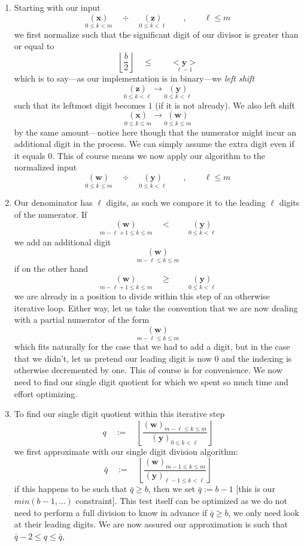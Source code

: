 \documentclass[twoside]{article}
\renewcommand{\leq}{\ensuremath{\quad\le\qquad}}
\renewcommand{\geq}{\ensuremath{\quad\ge\qquad}}
\newcommand{\bunderseq}[2][u]{\ensuremath{\underset{#2}{<\!\!\bm{#1}\!\!>}}}
\newcommand{\bradix}[2][u]{\ensuremath{\underset{#2}{(\bm{#1})}}}
\newcommand{\numer}[3][w]{\ensuremath{(\bm{#1})_{#2\le k\le #3}}}
\newcommand{\denom}[3][y]{\ensuremath{(\bm{#1})_{#2\le k <  #3}}}
\begin{document}
\begin{enumerate}
\item Starting with our input
$$ \bradix[x]{0\le k < m}\quad\div\quad\bradix[z]{0\le k < \ell}\qquad,\qquad \ell\le m $$
we first normalize such that the significant digit of our divisor is greater than or equal to
$$ \left\lfloor\frac{b}{2}\right\rfloor\leq\bunderseq[y]{\ell-1} $$
which is to say---as our implementation is in binary---we \emph{left shift}
$$ \bradix[z]{0\le k < \ell}\to\bradix[y]{0\le k < \ell} $$
such that its leftmost digit becomes $ 1 $ (if it is not already). We also left shift
$$ \bradix[x]{0\le k\le m}\to\bradix[w]{0\le k\le m} $$
by the same amount---notice here though that the numerator might incur an additional digit in the process. We can simply assume
the extra digit even if it equals $ 0 $. This of course means we now apply our algorithm to the normalized input
$$ \bradix[w]{0\le k\le m}\quad\div\quad\bradix[y]{0\le k < \ell}\qquad,\qquad \ell\le m $$
\item Our denominator has $ \ell $ digits, as such we compare it to the leading $ \ell $ digits of the numerator. If
$$ \bradix[w]{m-\ell+1\le k\le m}\quad <\qquad\bradix[y]{0\le k < \ell} $$
we add an additional digit
$$ \bradix[w]{m-\ell\le k\le m} $$
if on the other hand
$$ \bradix[w]{m-\ell+1\le k\le m}\geq\bradix[y]{0\le k < \ell} $$
we are already in a position to divide within this step of an otherwise iterative loop.
Either way, let us take the convention that we are now dealing with a partial numerator of the form
$$ \bradix[w]{m-\ell\le k\le m} $$
which fits naturally for the case that we had to add a digit, but in the case that we didn't, let us pretend our leading digit
is now $ 0 $ and the indexing is otherwise decremented by one. This of course is for convenience. We now need to find our single
digit quotient for which we spent so much time and effort optimizing.
\item To find our single digit quotient within this iterative step
$$ q\quad:=\quad\left\lfloor\frac{\numer{m-\ell}{m}}{\denom{0}{\ell}}\right\rfloor $$
we first approximate with our single digit division algorithm:
$$ \bar{q}\quad:=\quad\left\lfloor\frac{\numer{m-1}{m}}{\denom{\ell-1}{\ell}}\right\rfloor $$
if this happens to be such that $ \bar{q}\ge b $, then we set $ \bar{q}:=b-1 $ [this is our $ min(b-1, \ldots) $ constraint].
This test itself can be optimized as we do not need to perform a full division to know in advance if $ \bar{q}\ge b $,
we only need look at their leading digits.  We are now assured our approximation is such that $ \bar{q}-2\le q\le\bar{q} $,

\end{enumerate}
\end{document}
